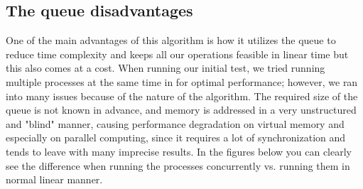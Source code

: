 \documentclass{article}
\begin{document}
\subsection{The queue disadvantages}
\begin{flushleft}
One of the main advantages of this algorithm is how it utilizes the queue to reduce time complexity and keeps all our operations feasible in linear time but this also comes at a cost. When running our initial test, we tried running multiple processes at the same time in for optimal performance; however, we ran into many issues because of the nature of the algorithm. The required size of the queue is not known in advance, and memory is addressed in a very unstructured and "blind" manner, causing performance degradation on
virtual memory and especially on parallel computing, since it requires a lot of synchronization and tends to leave with many imprecise results. In the figures below you can clearly see the difference when running the processes concurrently vs. running them in normal linear manner.
\end{flushleft}
\end{document}
